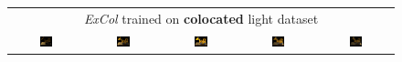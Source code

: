 \begin{figure}[!htb]
\begin{tabular*}{\textwidth}{ c c c c c }
        \multicolumn{5}{c}{\textit{ExCol} trained on \textbf{colocated} light dataset} \\
          \includegraphics[width=0.19\textwidth]{figures/results/arb_set/dynamic_light/excol_col_vc0_ld-90.png}
        & \includegraphics[width=0.19\textwidth]{figures/results/arb_set/dynamic_light/excol_col_vc0_ld-60.png}
        & \includegraphics[width=0.19\textwidth]{figures/results/arb_set/dynamic_light/excol_col_vc0_ld0.png}
        & \includegraphics[width=0.19\textwidth]{figures/results/arb_set/dynamic_light/excol_col_vc0_ld60.png} 
        & \includegraphics[width=0.19\textwidth]{figures/results/arb_set/dynamic_light/excol_col_vc0_ld90.png} \\


\end{tabular*}
\end{figure}
